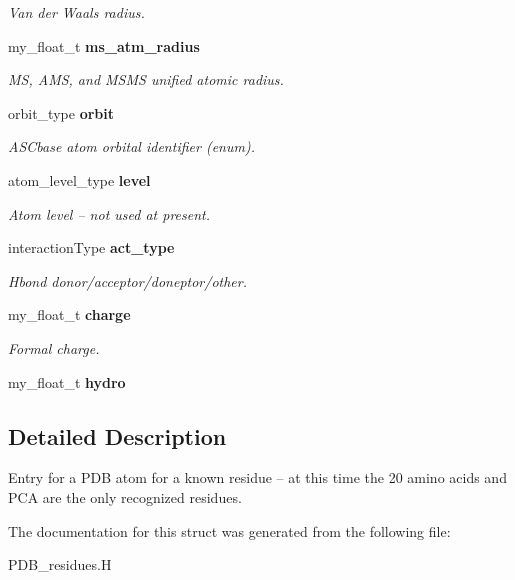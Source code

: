 \begin{CompactItemize}
\begin{CompactList}\small\item\em Van der Waals radius. \item\end{CompactList}\item 
my\_\-float\_\-t \bf{ms\_\-atm\_\-radius}\label{structASCbase_1_1pdb__atom__info__t_85cd46506603f9e16859ffb4eb8253f3}

\begin{CompactList}\small\item\em MS, AMS, and MSMS unified atomic radius. \item\end{CompactList}\item 
orbit\_\-type \bf{orbit}\label{structASCbase_1_1pdb__atom__info__t_ba6f5c5fe03c00f9a45a75435002ade7}

\begin{CompactList}\small\item\em ASCbase atom orbital identifier (enum). \item\end{CompactList}\item 
atom\_\-level\_\-type \bf{level}\label{structASCbase_1_1pdb__atom__info__t_75a6aa3b87f2a951f126b02ec1c695b4}

\begin{CompactList}\small\item\em Atom level -- not used at present. \item\end{CompactList}\item 
interaction\-Type \bf{act\_\-type}\label{structASCbase_1_1pdb__atom__info__t_357e6b496c8772df38cea08b87ffc6ef}

\begin{CompactList}\small\item\em Hbond donor/acceptor/doneptor/other. \item\end{CompactList}\item 
my\_\-float\_\-t \bf{charge}\label{structASCbase_1_1pdb__atom__info__t_29b41a3b93a3cae5f1a339eba15fffe2}

\begin{CompactList}\small\item\em Formal charge. \item\end{CompactList}\item 
my\_\-float\_\-t \textbf{hydro}\label{structASCbase_1_1pdb__atom__info__t_0e92ea9079ef595893055c25986fd504}

\end{CompactItemize}


\subsection{Detailed Description}
Entry for a PDB atom for a known residue -- at this time the 20 amino acids and PCA are the only recognized residues. 



The documentation for this struct was generated from the following file:\begin{CompactItemize}
\item 
PDB\_\-residues.H\end{CompactItemize}
